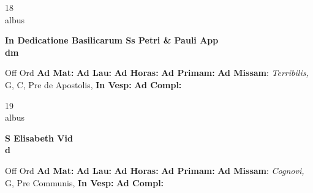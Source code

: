 \documentclass[10pt, openany]{book}
\begin{document}
    \begin{center}
        \begin{minipage}{3.5in}
            \vspace{2em}
            \begin{minipage}{0.5in}
                {\Huge 18} \\
                {\normalsize albus}
            \end{minipage}
            \begin{minipage}{3.0in}
                \textbf{ \large In Dedicatione Basilicarum Ss Petri \& Pauli App \\
                \textnormal{\normalsize dm}}

            \end{minipage}
            \begin{justify}Off Ord
                \textbf{Ad Mat: }
                \textbf{Ad Lau: }
                \textbf{Ad Horas: }
                \textbf{Ad Primam: }\textbf{Ad Missam}: \textit{Terribilis,} G, C, Pre de Apostolis, 
                \textbf{In Vesp: }
                \textbf{Ad Compl: }
            \end{justify}
        \end{minipage}
    \end{center}

    \begin{center}
        \begin{minipage}{3.5in}
            \vspace{2em}
            \begin{minipage}{0.5in}
                {\Huge 19} \\
                {\normalsize albus}
            \end{minipage}
            \begin{minipage}{3.0in}
                \textbf{ \large S Elisabeth Vid \\
                \textnormal{\normalsize d}}

            \end{minipage}
            \begin{justify}Off Ord
                \textbf{Ad Mat: }
                \textbf{Ad Lau: }
                \textbf{Ad Horas: }
                \textbf{Ad Primam: }\textbf{Ad Missam}: \textit{Cognovi,} G, Pre Communis, 
                \textbf{In Vesp: }
                \textbf{Ad Compl: }
            \end{justify}
        \end{minipage}
    \end{center}
\end{document}
